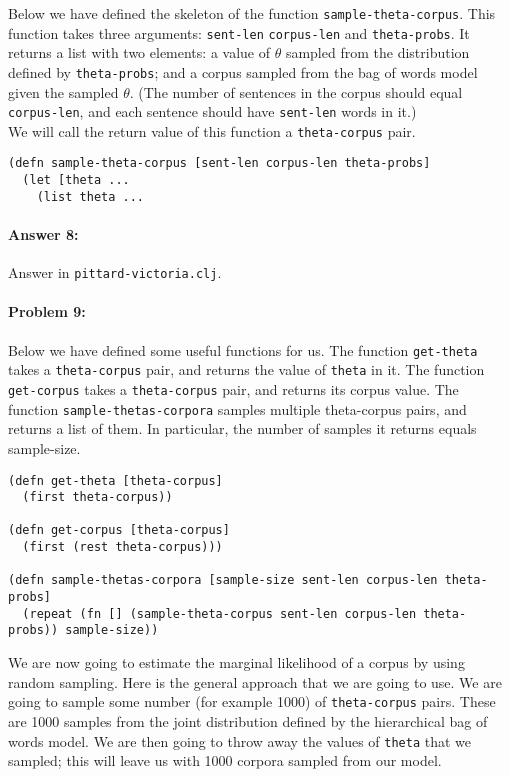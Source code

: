 \documentclass[10pt]{article}
\begin{document}
Below we have defined the skeleton of the function
\texttt{sample-theta-corpus}. This function takes three arguments:
\texttt{sent-len} \texttt{corpus-len} and \texttt{theta-probs}. It
returns a list with two elements: a value of $\theta$ sampled from the
distribution defined by \texttt{theta-probs}; and a corpus sampled
from the bag of words model given the sampled $\theta$. (The number of
sentences in the corpus should equal \texttt{corpus-len}, and each
sentence should have \texttt{sent-len} words in it.)
\\

\noindent We will call the return value of this function a \texttt{theta-corpus} pair.

\begin{lstlisting}
(defn sample-theta-corpus [sent-len corpus-len theta-probs]
  (let [theta ...
    (list theta ...
\end{lstlisting}

\paragraph{Answer 8:} Answer in
\texttt{pittard-victoria.clj}.

\hrulefill
\paragraph{Problem 9:}

Below we have defined some useful functions for us. The function
\texttt{get-theta} takes a \texttt{theta-corpus} pair, and returns the
value of \texttt{theta} in it. The function \texttt{get-corpus} takes
a \texttt{theta-corpus} pair, and returns its corpus value. The
function \texttt{sample-thetas-corpora} samples multiple theta-corpus
pairs, and returns a list of them. In particular, the number of
samples it returns equals sample-size.

\begin{lstlisting}
(defn get-theta [theta-corpus]
  (first theta-corpus))

(defn get-corpus [theta-corpus]
  (first (rest theta-corpus)))
  
(defn sample-thetas-corpora [sample-size sent-len corpus-len theta-probs]
  (repeat (fn [] (sample-theta-corpus sent-len corpus-len theta-probs)) sample-size))
\end{lstlisting}

\noindent We are now going to estimate the marginal likelihood of a corpus by
using random sampling. Here is the general approach that we are going
to use. We are going to sample some number (for example 1000) of
\texttt{theta-corpus} pairs. These are 1000 samples from the joint
distribution defined by the hierarchical bag of words model. We are
then going to throw away the values of \texttt{theta} that we sampled;
this will leave us with 1000 corpora sampled from our model.
\\
\end{document}
